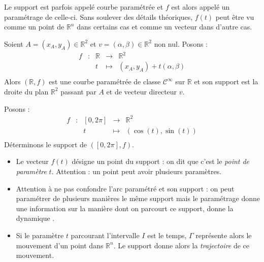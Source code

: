 \documentclass[a4paper,10pt]{report}
\begin{document}
\begin{Remarque}{} Le support est parfois appelé courbe paramétrée et $f$ est alors appelé un paramétrage de celle-ci. Sans soulever des détails théoriques, $f(t)$ peut être vu comme un point de $\mathbb{R}^n$ dans certains cas et comme un vecteur dans d'autre cas.
\end{Remarque}

\medskip

\begin{Exemple} Soient $A=(x_A,y_A) \in \mathbb{R}^2$ et $v= (\alpha, \beta) \in \mathbb{R}^2$ non nul. Posons :
$$ \begin{array}{ccccl}
f & : & \mathbb{R} & \rightarrow & \mathbb{R}^2 \\
 & & t & \mapsto & (x_A,y_A) + t (\alpha, \beta) \\
\end{array}$$
Alors $(\mathbb{R},f)$ est une courbe paramétrée de classe $\mathcal{C}^{\infty}$ sur $\mathbb{R}$ et son support est la droite du plan $\mathbb{R}^2$ passant par $A$ et de vecteur directeur $v$.
\end{Exemple}

\medskip

\begin{Exemple} Posons :
$$ \begin{array}{ccccl}
f & : & [0,2 \pi] & \rightarrow & \mathbb{R}^2 \\
 & & t & \mapsto & (\cos(t), \sin(t)) \\
\end{array}$$
Déterminons le support de $([0,2\pi],f)$.

\vspace{4cm}
\end{Exemple}

\begin{Remarques}{}
\begin{itemize}
\item Le vecteur $f(t)$ désigne un point du support : on dit que c'est le \emph{point de paramètre} $t$. Attention : un point peut avoir plusieurs paramètres.
\item Attention à ne pas confondre l'arc paramétré et son support : on peut paramétrer de plusieurs manières le même support mais le paramétrage donne une information sur la manière dont on parcourt ce support, donne la \og dynamique \fg .
\item Si le paramètre $t$ parcourant l'intervalle $I$ est le temps, $\Gamma$ représente alors le mouvement d'un point dans $\mathbb{R}^n$. Le support donne alors la \emph{trajectoire} de ce mouvement.
\end{itemize}
\end{Remarques}{}
\end{document}
